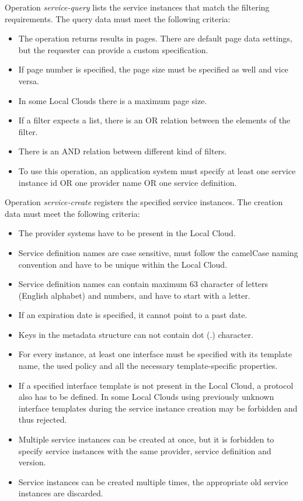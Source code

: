 \documentclass[a4paper]{arrowhead}
\begin{document}
Operation \textit{service-query} lists the service instances that match the filtering requirements. The query data must meet the following criteria:

\begin{itemize}
    \item The operation returns results in pages. There are default page data settings, but the requester can provide a custom specification.
    \item If page number is specified, the page size must be specified as well and vice versa.
    \item In some Local Clouds there is a maximum page size.
    \item If a filter expects a list, there is an OR relation between the elements of the filter.
    \item There is an AND relation between different kind of filters.
    \item To use this operation, an application system must specify at least one service instance id OR one provider name OR one service definition.
\end{itemize}


Operation \textit{service-create} registers the specified service instances. The creation data must meet the following criteria:

\begin{itemize}
    \item The provider systems have to be present in the Local Cloud.
    \item Service definition names are case sensitive, must follow the camelCase naming convention and have to be unique within the Local Cloud.
    \item Service definition names can contain maximum 63 character of letters (English alphabet) and numbers, and have to start with a letter.
    \item If an expiration date is specified, it cannot point to a past date.
    \item Keys in the metadata structure can not contain dot (.) character.
    \item For every instance, at least one interface must be specified with its template name, the used policy and all the necessary template-specific properties.
    \item If a specified interface template is not present in the Local Cloud, a protocol also has to be defined. In some Local Clouds using previously unknown interface templates during the service instance creation may be forbidden and thus rejected.
    \item Multiple service instances can be created at once, but it is forbidden to specify service instances with the same provider, service definition and version.
    \item Service instances can be created multiple times, the appropriate old service instances are discarded.
\end{itemize}
\end{document}

